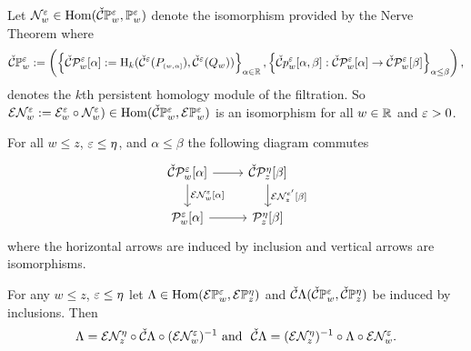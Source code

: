 %
%
%


Let $\N_w^\e\in\Hom(\CPP{w}{\e}, \PP{w}{\e})$
denote the isomorphism provided by the Nerve Theorem where
\[\CPP{w}{\e} := \left(\left\{\CP{w}{\e}{\alpha} := \hom_k(\cech^\e(P\subi{w,\alpha}),\cech^\e(Q_w))\right\}_{\alpha\in\R}, \left\{\cech p_w^\e[\alpha,\beta] : \CP{w}{\e}{\alpha}\to\CP{w}{\e}{\beta}\right\}_{\alpha\leq\beta}\right),\]
denotes the $k$th persistent homology module of the \Cech filtration.
So $\E\N_w^\e := \E_w^\e\circ \N_w^\e)\in\Hom(\CPP{w}{\e}, \ext{\PP{w}{\e}})$ is an isomorphism for all $w\in\R$ and $\e > 0$.

\begin{lemma}\label{lem:excisive_nerve}
  For all $w\leq z$, $\e\leq\eta$, and $\alpha\leq\beta$ the following diagram commutes
  \begin{equation}\begin{tikzcd}
    \CP{w}{\e}{\alpha}\arrow{r}\arrow{d}{\E\N_w^\e[\alpha]} &
    \CP{z}{\eta}{\beta}\arrow{d}{\E\N_{z}^{e'}[\beta]}\\
    \P{w}{\e}{\alpha}\arrow{r} &
    \P{z}{\eta}{\beta}
  \end{tikzcd}\end{equation}
  where the horizontal arrows are induced by inclusion and vertical arrows are isomorphisms.
\end{lemma}

\begin{corollary}\label{cor:excisive_nerve}
 For any $w\leq z$, $\e\leq\eta$ let $\Lambda\in\Hom(\E\PP{w}{\e},\E\PP{z}{\eta})$ and $\cech\Lambda(\CPP{w}{\e},\CPP{z}{\eta})$ be induced by inclusions.
 Then
 \[\Lambda = \E\N_{z}^{\eta}\circ \cech\Lambda\circ (\E\N_w^\e)^{-1}\text{ and }\ \cech\Lambda = (\E\N_{z}^{\eta})^{-1}\circ \Lambda\circ \E\N_w^\e.\]
\end{corollary}

